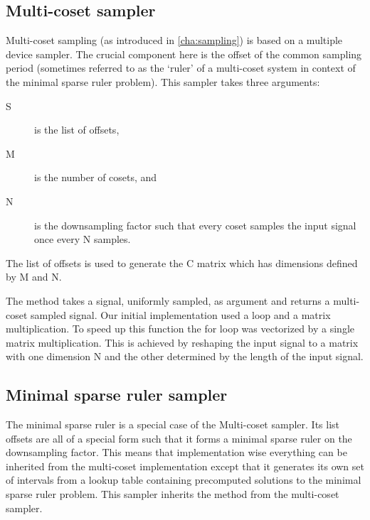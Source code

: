 \documentclass[a4paper, openany, oneside]{memoir}
\begin{document}
\subsection{Multi-coset sampler}
\label{sub:multi_coset_sampler}
Multi-coset sampling (as introduced in \cref{cha:sampling}) is based on a multiple device sampler. The crucial component here is the offset of the common sampling period (sometimes referred to as the `ruler' of a multi-coset system in context of the minimal sparse ruler problem). This sampler takes three arguments:
\begin{description}
    \item[S] is the list of offsets,
    \item[M] is the number of cosets, and
    \item[N] is the downsampling factor such that every coset samples the input signal once every N samples.
\end{description}
The list of offsets is used to generate the C matrix which has dimensions defined by M and N.

The method  takes a signal, uniformly sampled, as argument and returns a multi-coset sampled signal. Our initial implementation used a loop and a matrix multiplication. To speed up this function the for loop was vectorized by a single matrix multiplication. This is achieved by reshaping the input signal to a matrix with one dimension N and the other determined by the length of the input signal.

\subsection{Minimal sparse ruler sampler}
\label{sec:multi-coset-sampler}
The minimal sparse ruler is a special case of the Multi-coset sampler. Its list offsets are all of a special form such that it forms a minimal sparse ruler on the downsampling factor. This means that implementation wise everything can be inherited from the multi-coset implementation except that it generates its own set of intervals from a lookup table containing precomputed solutions to the minimal sparse ruler problem. This sampler inherits the  method from the multi-coset sampler.
\end{document}
